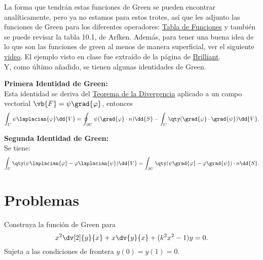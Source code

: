 La forma que tendrán estas funciones de Green se pueden encontrar analíticamente, pero ya no estamos para estos trotes, así que les adjunto las funciones de Green para los diferentes operadores: \href{https://en.wikipedia.org/wiki/Green\%27s_function#Table_of_Green's_functions}{Tabla de Funciones} y también se puede revisar la tabla 10.1, de Arfken. Además, para tener una buena idea de lo que son las funciones de green al menos de manera superficial, ver el siguiente \href{https://youtu.be/ism2SfZgFJg?si=Mi-57CoReH2CGW91}{video}. El ejemplo visto en clase fue extraído de la página de \href{https://brilliant.org/wiki/greens-functions-in-physics/}{Brilliant}. \\

Y, como último añadido, se tienen algunas identidades de Green.

\begin{mdframed}[style=warning]
	{\Large \textbf{Primera Identidad de Green:}} \\
	Esta identidad se deriva del \href{https://en.wikipedia.org/wiki/Divergence_theorem}{Teorema de la Divergencia} aplicado a un campo vectorial $\vb{F} = \psi \grad{\varphi}$, entonces
		$$ \int _U \psi \laplacian{\varphi} \dd{V} = \oint _{\partial U} \psi (\grad{\varphi} \cdot n) \dd{S} - \int _U \qty(\grad{\varphi} \cdot \grad{\psi}) \dd{V}. $$
\end{mdframed}



\begin{mdframed}[style=warning]
	{\Large \textbf{Segunda Identidad de Green:}}\\
	Se tiene:
		$$ \int _U \qty(\psi \laplacian{\varphi} - \varphi \laplacian{\psi}) \dd{V} = \int _{\partial U} \qty(\psi \grad{\varphi} - \varphi \grad{\psi}) \cdot n \dd{S}. $$
\end{mdframed}







\pagebreak


\section*{Problemas}


\begin{ejercicio}
	Construya la función de Green para
		$$ x^2 \dv[2]{y}{x} + x\dv{y}{x} + (k^2 x^2 - 1)y = 0. $$
	Sujeta a las condiciones de frontera $y(0) = y(1) = 0$.
\end{ejercicio}












